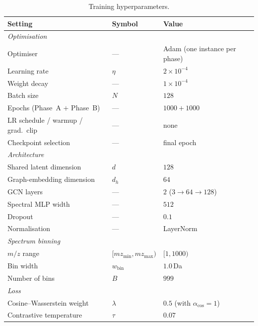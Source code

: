 \begin{table}[H]
    \centering
    \small
    \caption{Training hyperparameters.}
    \label{tab:training-hyperparams}
    \begin{tabular}{lll}
        \hline
        Setting & Symbol & Value \\
        \hline
        \multicolumn{3}{l}{\emph{Optimisation}} \\
        Optimiser                         & ---                              & Adam (one instance per phase) \\
        Learning rate                     & $\eta$                           & $2\times10^{-4}$ \\
        Weight decay                      & ---                              & $1\times10^{-4}$ \\
        Batch size                        & $N$                              & $128$ \\
        Epochs (Phase~A $+$ Phase~B)      & ---                              & $1000 + 1000$ \\
        LR schedule / warmup / grad.\ clip & ---                             & none \\
        Checkpoint selection              & ---                              & final epoch \\
        \hline
        \multicolumn{3}{l}{\emph{Architecture}} \\
        Shared latent dimension           & $d$                              & $128$ \\
        Graph-embedding dimension         & $d_h$                            & $64$ \\
        GCN layers                        & ---                              & $2$ ($3\!\to\!64\!\to\!128$) \\
        Spectral MLP width                & ---                              & $512$ \\
        Dropout                           & ---                              & $0.1$ \\
        Normalisation                     & ---                              & LayerNorm \\
        \hline
        \multicolumn{3}{l}{\emph{Spectrum binning}} \\
        $m/z$ range                       & $[mz_{\min}, mz_{\max})$         & $[1, 1000)$ \\
        Bin width                         & $w_{\mathrm{bin}}$               & $1.0$\,Da \\
        Number of bins                    & $B$                              & $999$ \\
        \hline
        \multicolumn{3}{l}{\emph{Loss}} \\
        Cosine--Wasserstein weight        & $\lambda$                        & $0.5$ (with $\alpha_{\cos}=1$) \\
        Contrastive temperature           & $\tau$                           & $0.07$ \\
        \hline
    \end{tabular}
\end{table}

